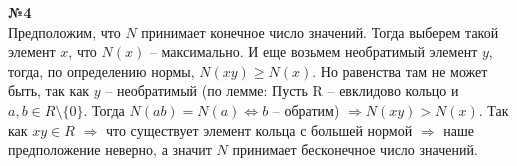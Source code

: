 \documentclass[a4paper, 12pt]{article}
\begin{document}
	 \textbf{№4} \\
	 
	 Предположим, что $N$ принимает конечное число значений. Тогда выберем такой элемент $x$, что $N(x)$ -- максимально. И еще возьмем необратимый элемент $y$, тогда, по определению нормы, $N(xy) \geqslant N(x)$. Но равенства там не может быть, так как $y$ -- необратимый (по лемме: Пусть R -- евклидово кольцо и $a, b \in R\setminus \{0\}$. Тогда $N(ab) = N(a) \Leftrightarrow b$ -- обратим) $\Rightarrow N(xy) > N(x)$. Так как $xy \in R$ $\Rightarrow$ что существует элемент кольца с большей нормой $\Rightarrow$ наше предположение неверно, а значит $N$ принимает бесконечное число значений. \\
	
\end{document}
